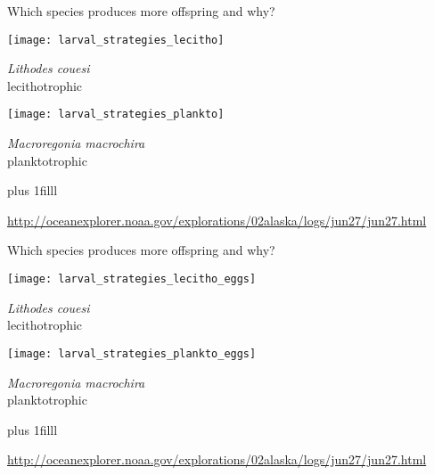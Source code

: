 \documentclass[t]{beamer}
\begin{document}
\begin{frame}[t]{Which species produces more offspring and why?}
	\begin{multicols}{2}

	\begin{center}
		\texttt{[image: larval\_strategies\_lecitho]}
		
		\textit{Lithodes couesi}\\
		lecithotrophic

	\end{center}	
	\columnbreak

	\begin{center}	
		\texttt{[image: larval\_strategies\_plankto]}

		\textit{Macroregonia macrochira}\\
		planktotrophic
	\end{center}
	\end{multicols}
	
	\vspace*{-\baselineskip}
	
	
	\vskip0pt plus 1filll
	
	\tiny \url{http://oceanexplorer.noaa.gov/explorations/02alaska/logs/jun27/jun27.html}
\end{frame}

\begin{frame}[t]{Which species produces more offspring and why?}
	\begin{multicols}{2}

	\begin{center}
		\texttt{[image: larval\_strategies\_lecitho\_eggs]}
		
		\textit{Lithodes couesi}\\
		lecithotrophic

	\end{center}	
	\columnbreak

	\begin{center}	
		\texttt{[image: larval\_strategies\_plankto\_eggs]}

		\textit{Macroregonia macrochira}\\
		planktotrophic
	\end{center}
	\end{multicols}
	
	
	\vskip0pt plus 1filll
	
	\tiny \url{http://oceanexplorer.noaa.gov/explorations/02alaska/logs/jun27/jun27.html}
\end{frame}
\end{document}
